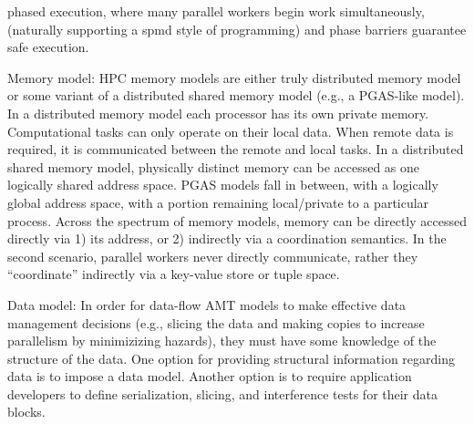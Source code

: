 \begin{compactdesc}
    \gls{phased execution}, where many parallel workers begin work simultaneously, (naturally supporting a \gls{spmd}
    style of programming) and \glspl{phase barrier} guarantee safe execution. 
\item[Memory model:]
  \gls{HPC} \glspl{memory model} are either truly \gls{distributed memory
  model} or some variant of a \gls{distributed shared memory model} (e.g., a \gls{PGAS}-like model).  In a
     \gls{distributed memory model} each processor has its own private memory. 
     Computational tasks can only operate on their local data. When remote data
     is required, it is communicated between the remote and local tasks.
     In a \gls{distributed shared memory model}, physically distinct memory can be accessed as one
     logically shared address space.  \gls{PGAS} models fall in between, with a
     logically global address space, with a portion remaining local/private to
     a particular process.  Across the spectrum of memory models, memory can be
    directly accessed directly via 1) its address, or 2) indirectly via a
    \gls{coordination semantics}. In the second scenario, parallel workers never directly
    communicate, rather they ``coordinate'' indirectly via a \gls{key-value
    store} or \gls{tuple space}.  
\item[Data model:]
  In order for data-flow \gls{AMT} models to make effective data management
  decisions (e.g., \gls{slicing} the data and making copies to increase
  parallelism  by minimizizing hazards), they must have some knowledge of the
  structure of the data.
  One option for providing structural information regarding data is to impose a
  \gls{data model}.  Another option is to require application developers to define
  \gls{serialization}, \gls{slicing}, and \glspl{interference test} for their data blocks. 
\end{compactdesc}

